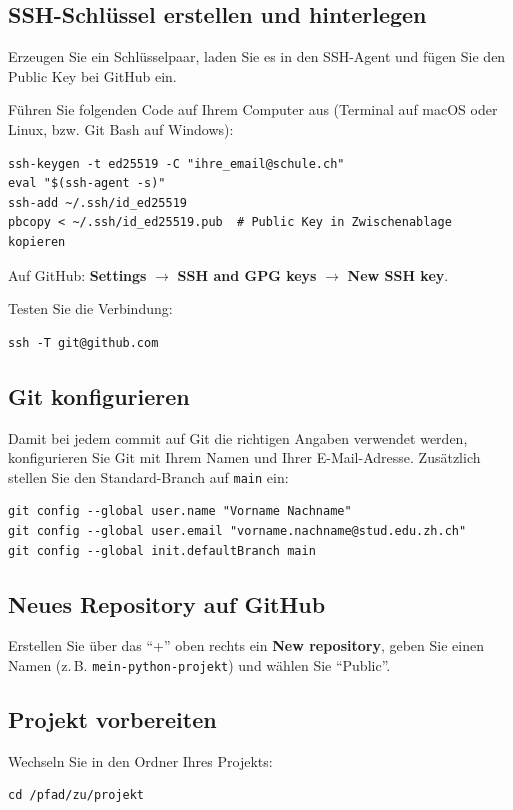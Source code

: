 \subsection*{SSH-Schlüssel erstellen und hinterlegen}
Erzeugen Sie ein Schlüsselpaar, laden Sie es in den SSH-Agent und fügen Sie den Public Key bei GitHub ein.

Führen Sie folgenden Code auf Ihrem Computer aus (Terminal auf macOS oder Linux, bzw. Git Bash auf Windows):
\begin{lstlisting}[style=bash]
ssh-keygen -t ed25519 -C "ihre_email@schule.ch"
eval "$(ssh-agent -s)"
ssh-add ~/.ssh/id_ed25519
pbcopy < ~/.ssh/id_ed25519.pub  # Public Key in Zwischenablage kopieren
\end{lstlisting}


Auf GitHub: \textbf{Settings} $\rightarrow$ \textbf{SSH and GPG keys} $\rightarrow$ \textbf{New SSH key}.  

Testen Sie die Verbindung:  
\begin{lstlisting}[style=bash]
ssh -T git@github.com
\end{lstlisting}

\subsection*{Git konfigurieren}
Damit bei jedem commit auf Git die richtigen Angaben verwendet werden, konfigurieren Sie Git mit Ihrem Namen und Ihrer E-Mail-Adresse. Zusätzlich stellen Sie den Standard-Branch auf \lstinline|main| ein:

\begin{lstlisting}[style=bash]
git config --global user.name "Vorname Nachname"
git config --global user.email "vorname.nachname@stud.edu.zh.ch"
git config --global init.defaultBranch main
\end{lstlisting}

\subsection*{Neues Repository auf GitHub}
Erstellen Sie über das \enquote{+} oben rechts ein \textbf{New repository}, geben Sie einen Namen (z.\,B. \lstinline|mein-python-projekt|) und wählen Sie \enquote{Public}.



\subsection*{Projekt vorbereiten}
Wechseln Sie in den Ordner Ihres Projekts:  
\begin{lstlisting}[style=bash]
cd /pfad/zu/projekt
\end{lstlisting}

